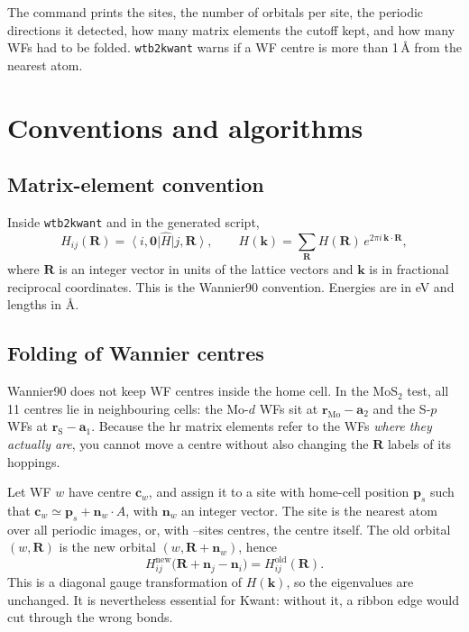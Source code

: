 \documentclass[11pt,a4paper]{article}
\newcommand{\code}[1]{{\ttfamily\def\_{\textunderscore\allowbreak}\def\slash{/\allowbreak}#1}}
\newcommand{\tool}{\texttt{wtb2kwant}}
\newcommand{\ket}[1]{\left|#1\right\rangle}
\newcommand{\bra}[1]{\left\langle#1\right|}
\begin{document}
The command prints the sites, the number of orbitals per site, the periodic directions it
detected, how many matrix elements the cutoff kept, and how many WFs had to be folded.
\tool{} warns if a WF centre is more than 1\,\AA{} from the nearest atom.

\section{Conventions and algorithms}

\subsection{Matrix-element convention}
Inside \tool{} and in the generated script,
\begin{equation}
  H_{ij}(\mathbf{R}) = \bra{i,\mathbf{0}}\hat H\ket{j,\mathbf{R}}, \qquad
  H(\mathbf{k}) = \sum_{\mathbf{R}} H(\mathbf{R})\, e^{2\pi i\,\mathbf{k}\cdot\mathbf{R}},
\end{equation}
where $\mathbf{R}$ is an integer vector in units of the lattice vectors and $\mathbf{k}$
is in fractional reciprocal coordinates. This is the Wannier90 convention. Energies are in
eV and lengths in \AA.

\subsection{Folding of Wannier centres}\label{sec:folding}
Wannier90 does not keep WF centres inside the home cell. In the MoS$_2$ test, all
11 centres lie in neighbouring cells: the Mo-$d$ WFs sit at $\mathbf{r}_\text{Mo}-\mathbf{a}_2$
and the S-$p$ WFs at $\mathbf{r}_\text{S}-\mathbf{a}_1$. Because the \code{hr} matrix
elements refer to the WFs \emph{where they actually are}, you cannot move a centre without
also changing the $\mathbf{R}$ labels of its hoppings.

Let WF $w$ have centre $\mathbf{c}_w$, and assign it to a site with home-cell position
$\mathbf{p}_s$ such that $\mathbf{c}_w \simeq \mathbf{p}_s + \mathbf{n}_w\cdot A$, with
$\mathbf{n}_w$ an integer vector. The site is the nearest atom over all periodic images,
or, with \code{--sites centres}, the centre itself. The old orbital $(w,\mathbf{R})$ is the
new orbital $(w,\mathbf{R}+\mathbf{n}_w)$, hence
\begin{equation}
  H^\text{new}_{ij}\big(\mathbf{R}+\mathbf{n}_j-\mathbf{n}_i\big) = H^\text{old}_{ij}(\mathbf{R}).
\end{equation}
This is a diagonal gauge transformation of $H(\mathbf{k})$, so the eigenvalues are
unchanged. It is nevertheless essential for Kwant: without it, a ribbon edge would cut
through the wrong bonds.
\end{document}
